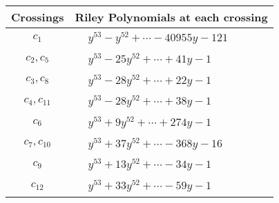 \documentclass[1p]{elsarticle_modified}
\theoremstyle{definition}
\begin{document}
\begin{tabular}{m{50pt}|m{274pt}}
Crossings & \hspace{64pt}Riley Polynomials at each crossing \\
\hline $$\begin{aligned}c_{1}\end{aligned}$$&$\begin{aligned}
&y^{53}- y^{52}+\cdots-40955 y-121
\end{aligned}$\\
\hline $$\begin{aligned}c_{2},c_{5}\end{aligned}$$&$\begin{aligned}
&y^{53}-25 y^{52}+\cdots+41 y-1
\end{aligned}$\\
\hline $$\begin{aligned}c_{3},c_{8}\end{aligned}$$&$\begin{aligned}
&y^{53}-28 y^{52}+\cdots+22 y-1
\end{aligned}$\\
\hline $$\begin{aligned}c_{4},c_{11}\end{aligned}$$&$\begin{aligned}
&y^{53}-28 y^{52}+\cdots+38 y-1
\end{aligned}$\\
\hline $$\begin{aligned}c_{6}\end{aligned}$$&$\begin{aligned}
&y^{53}+9 y^{52}+\cdots+274 y-1
\end{aligned}$\\
\hline $$\begin{aligned}c_{7},c_{10}\end{aligned}$$&$\begin{aligned}
&y^{53}+37 y^{52}+\cdots-368 y-16
\end{aligned}$\\
\hline $$\begin{aligned}c_{9}\end{aligned}$$&$\begin{aligned}
&y^{53}+13 y^{52}+\cdots-34 y-1
\end{aligned}$\\
\hline $$\begin{aligned}c_{12}\end{aligned}$$&$\begin{aligned}
&y^{53}+33 y^{52}+\cdots-59 y-1
\end{aligned}$\\
\hline
\end{tabular}\\~\\
\end{document}
